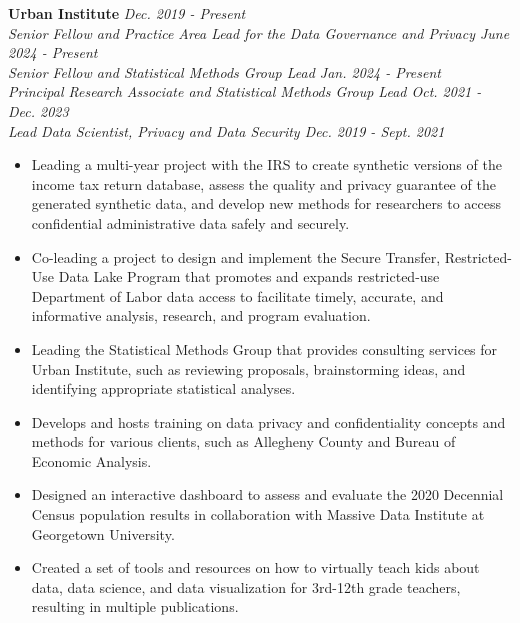 \documentclass[11pt, letterpaper, roman]{moderncv} %
\begin{document}
\textbf{Urban Institute} \hfill \textit{Dec. 2019 - Present}\\
    \textit{Senior Fellow and  Practice Area Lead for the Data Governance and Privacy \hfill June 2024 - Present}\\
    \textit{Senior Fellow and Statistical Methods Group Lead \hfill Jan. 2024 - Present}\\
    \textit{Principal Research Associate and Statistical Methods Group Lead \hfill Oct. 2021 - Dec. 2023}\\
    \textit{Lead Data Scientist, Privacy and Data Security \hfill Dec. 2019 - Sept. 2021}
    \begin{itemize}
        \item Leading a multi-year project with the IRS to create synthetic versions of the income tax return database, assess the quality and privacy guarantee of the generated synthetic data, and develop new methods for researchers to access confidential administrative data safely and securely.
        \item Co-leading a project to design and implement the Secure Transfer, Restricted-Use Data Lake Program that promotes and expands restricted-use Department of Labor data access to facilitate timely, accurate, and informative analysis, research, and program evaluation.
        \item Leading the Statistical Methods Group that provides consulting services for Urban Institute, such as reviewing proposals, brainstorming ideas, and identifying appropriate statistical analyses.
        \item Develops and hosts training on data privacy and confidentiality concepts and methods for various clients, such as Allegheny County and Bureau of Economic Analysis.
        \item Designed an interactive dashboard to assess and evaluate the 2020 Decennial Census population results in collaboration with Massive Data Institute at Georgetown University.
        \item Created a set of tools and resources on how to virtually teach kids about data, data science, and data visualization for 3rd-12th grade teachers, resulting in multiple publications.
    \end{itemize}
\end{document}
